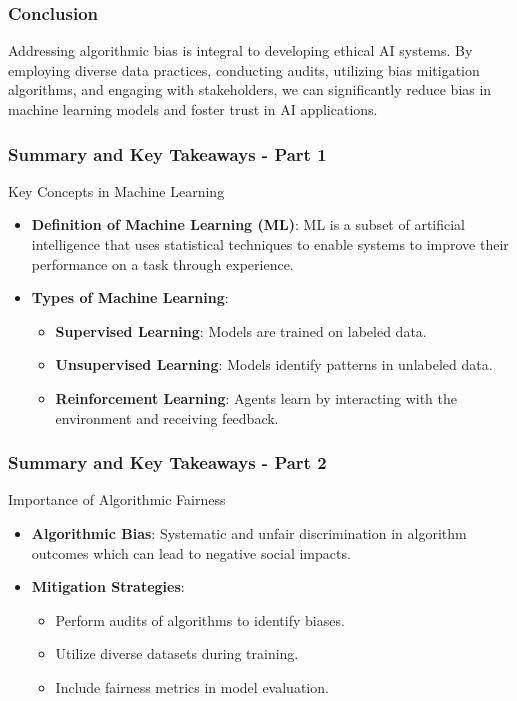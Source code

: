 \documentclass[aspectratio=169]{beamer}
\begin{document}
\begin{frame}[fragile]
    \frametitle{Conclusion}
    Addressing algorithmic bias is integral to developing ethical AI systems. 
    By employing diverse data practices, conducting audits, utilizing bias mitigation algorithms, and engaging with stakeholders, we can significantly reduce bias in machine learning models and foster trust in AI applications.
\end{frame}

\begin{frame}[fragile]
    \frametitle{Summary and Key Takeaways - Part 1}
    \begin{block}{Key Concepts in Machine Learning}
        \begin{itemize}
            \item \textbf{Definition of Machine Learning (ML)}: ML is a subset of artificial intelligence that uses statistical techniques to enable systems to improve their performance on a task through experience.
            \item \textbf{Types of Machine Learning}:
            \begin{itemize}
                \item \textbf{Supervised Learning}: Models are trained on labeled data. 
                \item \textbf{Unsupervised Learning}: Models identify patterns in unlabeled data.
                \item \textbf{Reinforcement Learning}: Agents learn by interacting with the environment and receiving feedback.
            \end{itemize}
        \end{itemize}
    \end{block}
\end{frame}

\begin{frame}[fragile]
    \frametitle{Summary and Key Takeaways - Part 2}
    \begin{block}{Importance of Algorithmic Fairness}
        \begin{itemize}
            \item \textbf{Algorithmic Bias}: Systematic and unfair discrimination in algorithm outcomes which can lead to negative social impacts.
            \item \textbf{Mitigation Strategies}:
            \begin{itemize}
                \item Perform audits of algorithms to identify biases.
                \item Utilize diverse datasets during training.
                \item Include fairness metrics in model evaluation.
            \end{itemize}
        \end{itemize}
    \end{block}
\end{frame}
\end{document}
